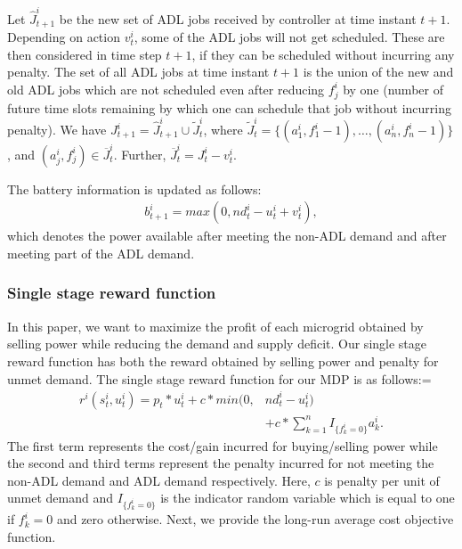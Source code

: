  Let $\widehat J_{t+1}^{i}$ be the new set of ADL jobs received by controller at time instant $t+1$. Depending on action $v_{t}^{i}$, some of the ADL jobs will not get scheduled. These are then considered in time step $t+1$, if they can be scheduled without incurring any penalty. The set of all ADL jobs at time instant $t+1$ is the union of the new and old ADL jobs which are not scheduled even after reducing $f_{j}^{i}$ by one (number of future time slots remaining by which one can schedule that job without incurring penalty).
We have $J_{t+1}^{i} = \widehat J_{t+1}^{i} \cup \widetilde J_{t}^{i}$, where $\widetilde J_{t}^{i} =  \{(a_{1}^{i}, f_{1}^{i} - 1),\ldots,(a_{n}^{i}, f_{n}^{i} - 1)\}$, and $ (a_{j}^{i}, f_{j}^{i}) \in \overline J_{t}^{i}$. Further, $\overline J_{t}^{i} = J_{t}^{i} - v_{t}^{i}$.

The battery information is updated as follows:
\begin{align}
b_{t+1}^{i} = max(0,nd_{t}^{i} - u_{t}^{i} + v_{t}^{i}),
\end{align}
which denotes the power available after meeting the non-ADL demand and after meeting part of the ADL demand.
\subsubsection{Single stage reward function}
In this paper, we want to maximize the profit of each microgrid obtained by selling power while reducing the demand and supply deficit. Our single stage reward function has both the reward obtained by selling power and penalty for unmet demand. The single stage reward  function for our MDP is as follows:=
\begin{align}
r^{i}(s_t^i,u_t^i) = p_{t}*u_{t}^{i} + c*min(0,&nd_{t}^{i} - u_{t}^{i})  \nonumber\\ &+ c* \sum_{k =1}^{n} I_{\{f_{k}^{i} = 0\}} a_{k}^{i} .
\end{align}
The first term represents the cost/gain incurred for  buying/selling  power while the second and third terms represent the penalty  incurred for not meeting the non-ADL demand and ADL demand respectively. Here, $c$ is penalty per unit of unmet demand and $I_{\{f_{k}^{i} = 0\}}$ is the indicator random variable which is equal to one if $f_{k}^{i} =0$ and zero otherwise. 
Next, we provide the long-run average cost objective function. 
